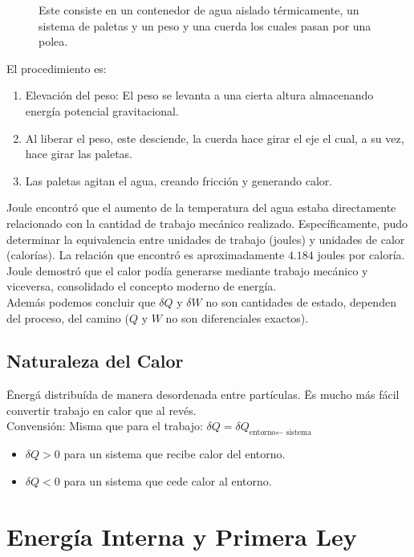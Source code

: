 \begin{enumerate}
\begin{figure}[H]
		\label{expJoule}
		\caption{Este consiste en un contenedor de agua aislado térmicamente, un sistema de paletas y un peso y una cuerda los cuales pasan por una polea.}
	\end{figure}
	El procedimiento es:
	\begin{enumerate}
		\item Elevación del peso: El peso se levanta a una cierta altura almacenando energía potencial gravitacional.
		\item Al liberar el peso, este desciende, la cuerda hace girar el eje el cual, a su vez, hace girar las paletas.
		\item Las paletas agitan el agua, creando fricción y generando calor.
	\end{enumerate}
	Joule encontró que el aumento de la temperatura del agua estaba directamente relacionado con la cantidad de trabajo mecánico realizado. Específicamente, pudo determinar la equivalencia entre unidades de trabajo (joules) y unidades de calor (calorías). La relación que encontró es aproximadamente $4.184$ joules por caloría. \\
	Joule demostró que el calor podía generarse mediante trabajo mecánico y viceversa, consolidado el concepto moderno de energía. \\
	Además podemos concluir que $\delta Q$ y $\delta W$ no son cantidades de estado, dependen del proceso, del camino ($Q$ y $W$ no son diferenciales exactos).
\end{enumerate}

\subsection{Naturaleza del Calor}
\" Energá distribuída de manera desordenada entre partículas. \" Es mucho más fácil convertir trabajo en calor que al revés. \\
Convensión: Misma que para el trabajo: $\delta Q = \delta Q_{\text{entorno} \leftarrow \text{ sistema}}$
\begin{itemize}
	\item $\delta Q > 0$ para un sistema que recibe calor del entorno.
	\item $\delta Q < 0$ para un sistema que cede calor al entorno.
\end{itemize}

\section{Energía Interna y Primera Ley}

